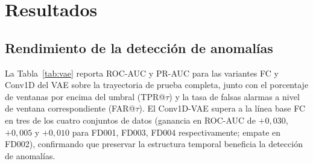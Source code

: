 \documentclass[5p,times,authoryear]{elsarticle}
\begin{document}
\begin{table}[!t]
\centering
\caption{Hiperparámetros de los modelos. Comunes a todos los modelos profundos: ventana $w{=}30$, límite RUL $125$, tamaño de lote $256$, recorte de gradiente en norma $1{,}0$, ReduceLROnPlateau (factor $0{,}5$, paciencia $4$), MC Dropout $T{=}50$.}
\label{tab:hyper}
\small
{}
\end{table}

\section{Resultados}\label{sec:results}

\subsection{Rendimiento de la detección de anomalías}\label{sec:results-vae}

La Tabla~\ref{tab:vae} reporta ROC-AUC y PR-AUC para las variantes FC y Conv1D del VAE sobre la trayectoria de prueba completa, junto con el porcentaje de ventanas por encima del umbral (TPR@$\tau$) y la tasa de falsas alarmas a nivel de ventana correspondiente (FAR@$\tau$). El Conv1D-VAE supera a la línea base FC en tres de los cuatro conjuntos de datos (ganancia en ROC-AUC de $+0{,}030$, $+0{,}005$ y $+0{,}010$ para FD001, FD003, FD004 respectivamente; empate en FD002), confirmando que preservar la estructura temporal beneficia la detección de anomalías.
\end{document}
